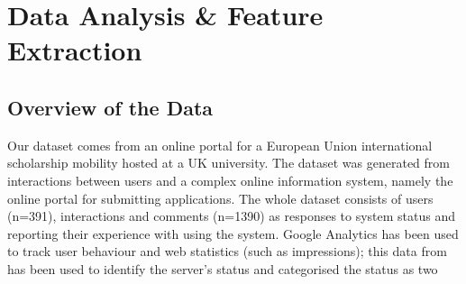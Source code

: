 \documentclass[graybox]{svmult}
\begin{document}
\section{Data Analysis \& Feature Extraction}\label{dataanalysis}

\subsection{Overview of the Data}
Our dataset comes from an online portal for a European Union 
international scholarship mobility hosted at a UK university. The
dataset was generated from interactions between users and a complex
online information system, namely the online portal for submitting
applications. The whole dataset consists of users (n=391), interactions and comments
(n=1390) as responses to system status and reporting their experience
with using the system. Google Analytics has been used to track user behaviour
and web statistics (such as impressions); this data from has been used
to identify the server's status and categorised the status as two
\end{document}
